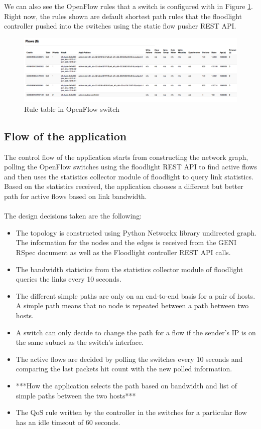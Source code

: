 \documentclass[paper=a4, fontsize=11pt]{scrartcl}	%
\numberwithin{equation}{section}		%
\numberwithin{figure}{section}			%
\numberwithin{table}{section}				%
\begin{document}
We can also see the OpenFlow rules that a switch is configured with in Figure \ref{Fig 4.3}. Right now, the rules shown are default shortest path rules that the floodlight controller pushed into the switches using the static flow pusher REST API.
\begin{figure}[H]
\begin{center}
\includegraphics[scale=0.35]{rules.png}   
\end{center}
 \caption{Rule table in OpenFlow switch}
 \label{Fig 4.3}
\end{figure}
\subsection{Flow of the application}
The control flow of the application starts from constructing the network graph, polling the OpenFlow switches using the floodlight REST API to find active flows and then uses the statistics collector module of floodlight to query link statistics. Based on the statistics received, the application chooses a different but better path for active flows based on link bandwidth.
\\
\\
The design decisions taken are the following:
\begin{itemize}
\item The topology is constructed using Python Networkx library undirected graph. The information for the nodes and the edges is received from the GENI RSpec document as well as the Floodlight controller REST API calls.
\item The bandwidth statistics from the statistics collector module of floodlight queries the links every 10 seconds.
\item The different simple paths are only on an end-to-end basis for a pair of hosts. A simple path means that no node is repeated between a path between two hosts.
\item A switch can only decide to change the path for a flow if the sender's IP is on the same subnet as the switch's interface.
\item The active flows are decided by polling the switches every 10 seconds and comparing the last packets hit count with the new polled information.
\item ***How the application selects the path based on bandwidth and list of simple paths between the two hosts***
\item The QoS rule written by the controller in the switches for a particular flow has an idle timeout of 60 seconds.

\end{itemize}


\end{document}
